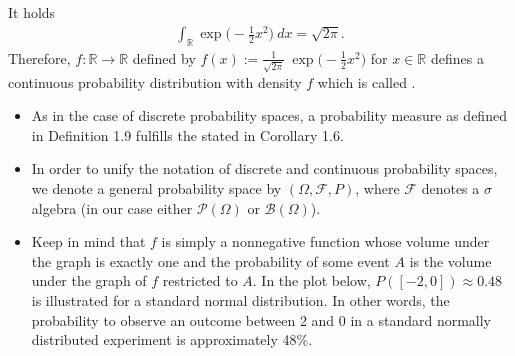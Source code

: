 \documentclass[letterpaper,10pt,english]{jupyterBook}
\begin{document}
\sphinxAtStartPar
It holds
\begin{equation*}
\begin{split} \int_{\mathbb{R}} \exp\big(-\frac{1}{2} x^2\big)~dx = \sqrt{2 \pi}.\end{split}
\end{equation*}
\sphinxAtStartPar
Therefore, \(f: \mathbb{R} \rightarrow \mathbb{R}\) defined by \(f(x):= \frac{1}{\sqrt{2 \pi}}~\exp\big(-\frac{1}{2} x^2\big)\) for \(x \in \mathbb{R}\) defines a continuous probability distribution with density \(f\) which is called .
\begin{itemize}
\item {} 
\sphinxAtStartPar
As in the case of discrete probability spaces, a probability measure as defined in Definition 1.9 fulfills the  stated in Corollary 1.6.

\item {} 
\sphinxAtStartPar
In order to unify the notation of discrete and continuous probability spaces, we denote a general probability space by \((\Omega, \mathcal{F}, P)\), where \(\mathcal{F}\) denotes a \(\sigma\)\sphinxhyphen{}algebra (in our case either \(\mathcal{P}(\Omega)\) or \(\mathcal{B}(\Omega)\)).

\item {} 
\sphinxAtStartPar
Keep in mind that \(f\) is simply a non\sphinxhyphen{}negative function whose volume under the graph is exactly one and the probability of some event \(A\) is the volume under the graph of \(f\) restricted to \(A\). In the plot below, \(P([-2, 0]) \approx 0.48\) is illustrated for a standard normal distribution. In other words, the probability to observe an outcome between \sphinxhyphen{}2 and 0 in a standard normally distributed experiment is approximately 48\%.

\end{itemize}
\end{document}
